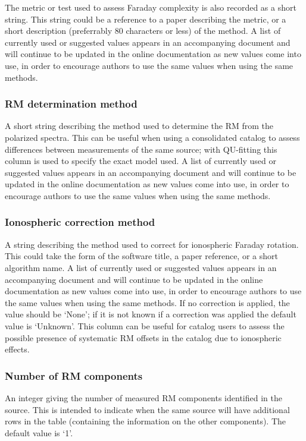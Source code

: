 \documentclass[10pt,modern]{aastex63}
\begin{document}
The metric or test used to assess Faraday complexity is also recorded as a short string. This string could be a reference to a paper describing the metric, or a short description (preferrably 80 characters or less) of the method. A list of currently used or suggested values appears in an accompanying document and will continue to be updated in the online documentation as new values come into use, in order to encourage authors to use the same values when using the same methods.

\subsubsection{RM determination method}
A short string describing the method used to determine the RM from the polarized spectra. This can be useful when using a consolidated catalog to assess differences between measurements of the same source; with QU-fitting this column is used to specify the exact model used. A list of currently used or suggested values appears in an accompanying document and will continue to be updated in the online documentation as new values come into use, in order to encourage authors to use the same values when using the same methods.

\subsubsection{Ionospheric correction method}
A string describing the method used to correct for ionospheric Faraday rotation. This could take the form of the software title, a paper reference, or a short algorithm name. A list of currently used or suggested values appears in an accompanying document and will continue to be updated in the online documentation as new values come into use, in order to encourage authors to use the same values when using the same methods. If no correction is applied, the value should be `None'; if it is not known if a correction was applied the default value is `Unknown'. This column can be useful for catalog users to assess the possible presence of systematic RM offsets in the catalog due to ionospheric effects.

\subsubsection{Number of RM components}
An integer giving the number of measured RM components identified in the source. This is intended to indicate when the same source will have additional rows in the table (containing the information on the other components). The default value is `1'.
\end{document}

